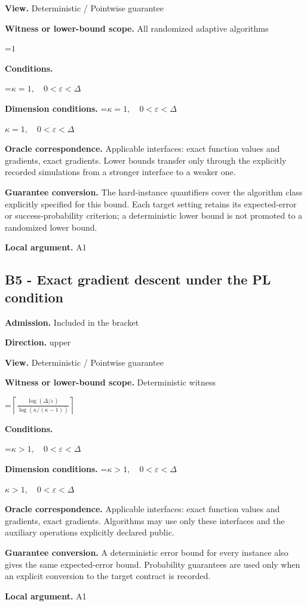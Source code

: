 \documentclass[10pt,a4paper]{article}
\newcommand{\AtlasMath}[1]{\par\begingroup\centering\setbox0=\hbox{$\displaystyle #1$}\ifdim\wd0>1.4\linewidth\typeout{ATLAS WIDE FORMULA: \the\wd0}\fi\ifdim\wd0>\linewidth\resizebox{\linewidth}{!}{\box0}\else\box0\fi\par\endgroup}
\newcommand{\AtlasInlineMath}[1]{\begingroup\setbox0=\hbox{$#1$}\ifdim\wd0>.4\linewidth\endgroup\AtlasMath{#1}\else\endgroup$#1$\fi}
\begin{document}
\textbf{View.} Deterministic / Pointwise guarantee

\textbf{Witness or lower-bound scope.} All randomized adaptive algorithms

\AtlasMath{1}
\textbf{Conditions.} 
\AtlasMath{\kappa=1,\quad0<\varepsilon<\Delta}


\textbf{Dimension conditions.} \AtlasInlineMath{\kappa=1,\quad0<\varepsilon<\Delta}

\textbf{Oracle correspondence.} Applicable interfaces: exact function values and gradients, exact gradients. Lower bounds transfer only through the explicitly recorded simulations from a stronger interface to a weaker one.

\textbf{Guarantee conversion.} The hard-instance quantifiers cover the algorithm class explicitly specified for this bound. Each target setting retains its expected-error or success-probability criterion; a deterministic lower bound is not promoted to a randomized lower bound.

\textbf{Local argument.} A1

\subsection{B5 - Exact gradient descent under the PL condition}
\textbf{Admission.} Included in the bracket

\textbf{Direction.} upper

\textbf{View.} Deterministic / Pointwise guarantee

\textbf{Witness or lower-bound scope.} Deterministic witness

\AtlasMath{\left\lceil\frac{\log(\Delta/\varepsilon)}{\log(\kappa/(\kappa-1))}\right\rceil}
\textbf{Conditions.} 
\AtlasMath{\kappa>1,\quad0<\varepsilon<\Delta}


\textbf{Dimension conditions.} \AtlasInlineMath{\kappa>1,\quad0<\varepsilon<\Delta}

\textbf{Oracle correspondence.} Applicable interfaces: exact function values and gradients, exact gradients. Algorithms may use only these interfaces and the auxiliary operations explicitly declared public.

\textbf{Guarantee conversion.} A deterministic error bound for every instance also gives the same expected-error bound. Probability guarantees are used only when an explicit conversion to the target contract is recorded.

\textbf{Local argument.} A1
\end{document}
